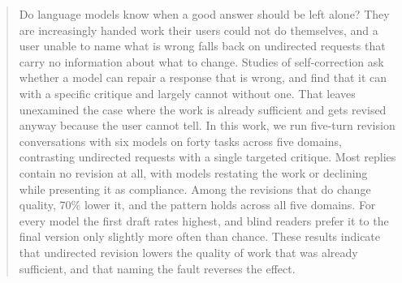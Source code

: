 \begin{abstract}
Do language models know when a good answer should be left alone? They are increasingly
handed work their users could not do themselves, and a user unable to name what is wrong
falls back on undirected requests that carry no information about what to change. Studies of
self-correction ask whether a model can repair a response that is wrong, and find that it
can with a specific critique and largely cannot without one. That leaves unexamined the case
where the work is already sufficient and gets revised anyway because the user cannot tell.
In this work, we run five-turn revision conversations with six models on forty tasks across
five domains, contrasting undirected requests with a single targeted critique. Most replies
contain no revision at all, with models restating the work or declining while presenting it
as compliance. Among the revisions that do change quality, 70\% lower it, and the pattern
holds across all five domains. For every model the first draft rates highest, and blind
readers prefer it to the final version only slightly more often than chance. These results
indicate that undirected revision lowers the quality of work that was already sufficient,
and that naming the fault reverses the effect.
\end{abstract}
